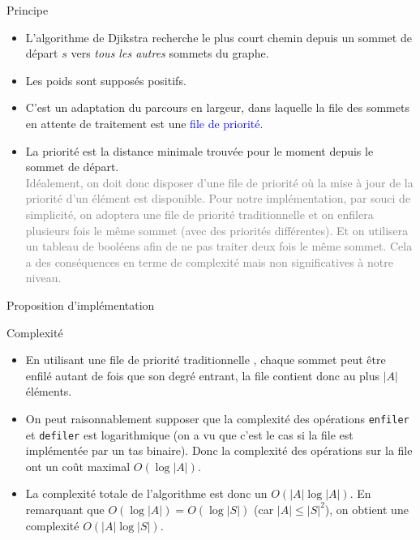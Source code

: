 \documentclass[10pt]{beamer}
\begin{document}
\begin{frame}[fragile]{\Ctitle}{\stitle}
	\begin{block}{Principe}
		\begin{itemize}
		\item<1-> L'algorithme de Djikstra recherche le plus court chemin depuis un sommet de départ $s$ vers \textit{tous les autres} sommets du graphe.
		\item<2-> Les poids sont supposés \textcolor{BrickRed}{positifs}.
		\item<3-> C'est un adaptation du parcours en largeur, dans laquelle la file des sommets en attente de traitement est une \textcolor{blue}{file de priorité}.
		\item<4->  La priorité est la distance minimale trouvée pour le moment depuis le sommet de départ. \\
		\textcolor{gray}{\small Idéalement, on doit donc disposer d'une file de priorité où la mise à jour de la priorité d'un élément est disponible. Pour notre implémentation, par souci de simplicité, on adoptera une file de priorité \og{} traditionnelle \fg{} et on enfilera plusieurs fois le même sommet (avec des priorités différentes). Et on utilisera un tableau de booléens afin de ne pas traiter deux fois le même sommet. Cela a des conséquences en terme de complexité mais non significatives à notre niveau.}
		\end{itemize}
	\end{block}
\end{frame}

\begin{frame}[fragile]{\Ctitle}{\stitle}
	\begin{block}{Proposition d'implémentation}
	\end{block}
\end{frame}

\begin{frame}[fragile]{\Ctitle}{\stitle}
	\begin{block}{Complexité}
		\begin{itemize}
		\item<1-> En utilisant une file de priorité \og{} traditionnelle \fg{}, chaque sommet peut être enfilé autant de fois que son degré entrant, la file contient donc au plus $|A|$ éléments. 
		\item<2-> On peut raisonnablement supposer que la complexité des opérations {\tt enfiler} et {\tt defiler} est logarithmique (on a vu que c'est le cas si la file est implémentée par un tas binaire). Donc la complexité des opérations sur la file ont un coût maximal $O(\log |A|)$.
		\item<3-> La complexité totale de l'algorithme est donc un $O(|A| \log |A|)$. En remarquant que $O(\log |A|)=O(\log |S|)$ (car $|A| \leq |S|^2$), on obtient une complexité \textcolor{BrickRed}{$O(|A|\log|S|)$}.
		\end{itemize}
	\end{block}
\end{frame}
\end{document}
